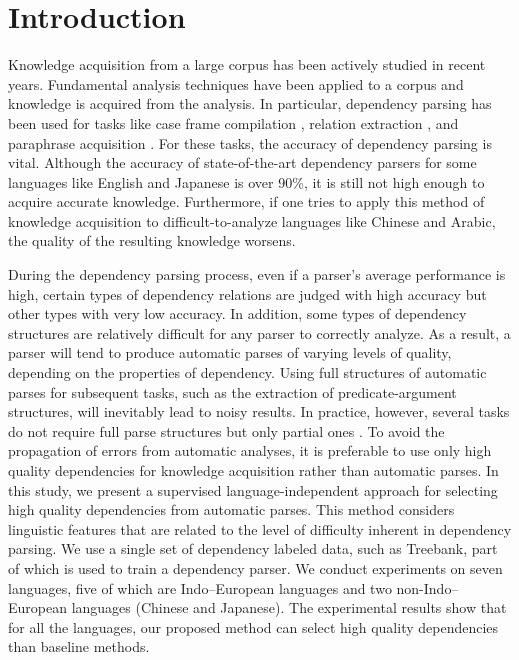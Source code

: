 \documentclass[english]{jnlp_1.4}
\begin{document}
\maketitle


\section{Introduction}

Knowledge acquisition from a large corpus has been actively studied
in recent years. Fundamental analysis techniques have been applied to a corpus and
knowledge is acquired from the analysis. In particular, dependency
parsing has been used for tasks like case frame compilation \cite{Kawahara:2006},
relation extraction \cite{Saeger:2011}, and paraphrase
acquisition \cite{Hashimoto:2011}. For these tasks,
the accuracy of dependency parsing is vital. Although the accuracy of
state-of-the-art dependency parsers for some languages like English and Japanese is over
90\%, it is still not high enough to acquire accurate
knowledge. Furthermore, if one tries to apply this method of knowledge
acquisition to difficult-to-analyze languages like Chinese and Arabic,
the quality of the resulting knowledge worsens.

During the dependency parsing process, even if a parser's average performance is high, certain types of dependency relations are judged with high accuracy but other types with very low accuracy. In addition, some types of dependency structures are relatively difficult for any parser to correctly analyze.
As a result, a parser will tend to produce automatic parses of varying levels of quality, depending on the properties of dependency.
Using full structures of automatic parses for subsequent tasks, such as the extraction of predicate-argument structures, will inevitably lead to noisy results.
In practice, however, several tasks do not require full parse structures but only partial ones \cite{flannery}.
To avoid the propagation of errors from automatic analyses, it is preferable to use only high quality dependencies for knowledge acquisition rather than automatic parses. 
In this study, we present a supervised language-independent approach for selecting high quality
dependencies from automatic parses. This method considers
linguistic features that are related to the level of 
difficulty inherent in dependency parsing. We use a single set of dependency labeled data, such as Treebank, part of which is used to train a dependency
parser. We conduct experiments on seven languages, five of which are
Indo--European languages and two non-Indo--European languages (Chinese and
Japanese). The experimental results show that for all the languages, our proposed method can
select high quality dependencies than baseline methods.
\end{document}
